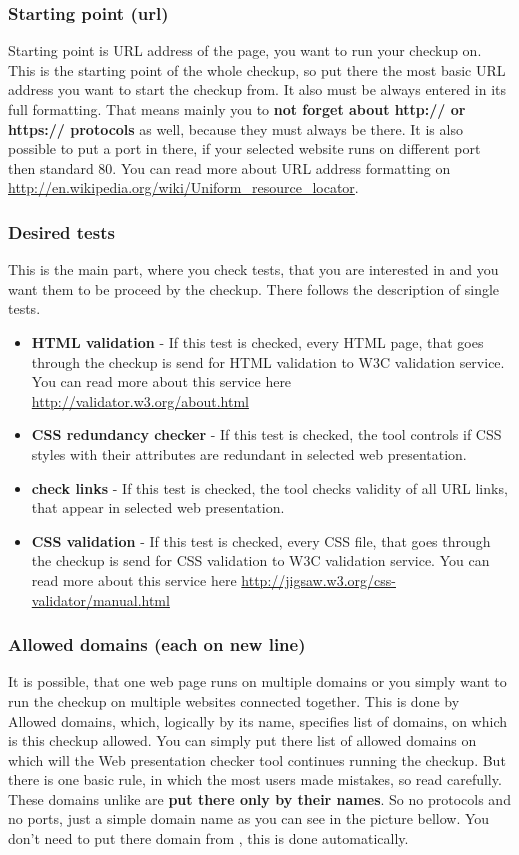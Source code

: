 \documentclass[12pt,a4paper]{article}
\begin{document}
\subsubsection{Starting point (url)} \label{address}
Starting point is URL address of the page, you want to run your checkup on. This is the starting point of the whole checkup, so put there the most basic URL address you want to start the checkup from. It also must be always entered in its full formatting. That means mainly you to \textbf{not forget about http://  or https:// protocols} as well, because they must always be there. It is also possible to put a port in there, if your selected website runs on different port then standard 80. You can read more about URL address formatting on \url{http://en.wikipedia.org/wiki/Uniform_resource_locator}.

\subsubsection{Desired tests}
This is the main part, where you check tests, that you are interested in and you want them to be proceed by the checkup.
There follows the description of single tests.
\begin{itemize}
	\item \textbf{HTML validation} - If this test is checked, every HTML page, that goes through the checkup is send for HTML validation to W3C validation service. You can read more about this service here \url{http://validator.w3.org/about.html}
	\item \textbf{CSS redundancy checker} - If this test is checked, the tool controls if CSS styles with their attributes are redundant in selected web presentation.
	\item \textbf{check links} - If this test is checked, the tool checks validity of all URL links, that appear in selected web presentation.
	\item \textbf{CSS validation} - If this test is checked, every CSS file, that goes through the checkup is send for CSS validation to W3C validation service. You can read more about this service here \url{http://jigsaw.w3.org/css-validator/manual.html}
\end{itemize}

\subsubsection{Allowed domains (each on new line)}
It is possible, that one web page runs on multiple domains or you simply want to run the checkup on multiple websites connected together. This is done by Allowed domains, which, logically by its name, specifies list of domains, on which is this checkup allowed. You can simply put there list of allowed domains on which will the Web presentation checker tool continues running the checkup. But there is one basic rule, in which the most users made mistakes, so read carefully. These domains unlike  are \textbf{put there only by their names}. So no protocols and no ports, just a simple domain name as you can see in the picture bellow. You don't need to put there domain from , this is done automatically.
\end{document}
